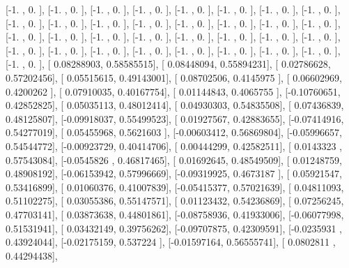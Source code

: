 \documentclass{article}
\begin{document}
       [-1.        ,  0.        ],
       [-1.        ,  0.        ],
       [-1.        ,  0.        ],
       [-1.        ,  0.        ],
       [-1.        ,  0.        ],
       [-1.        ,  0.        ],
       [-1.        ,  0.        ],
       [-1.        ,  0.        ],
       [-1.        ,  0.        ],
       [-1.        ,  0.        ],
       [-1.        ,  0.        ],
       [-1.        ,  0.        ],
       [-1.        ,  0.        ],
       [-1.        ,  0.        ],
       [-1.        ,  0.        ],
       [-1.        ,  0.        ],
       [-1.        ,  0.        ],
       [-1.        ,  0.        ],
       [-1.        ,  0.        ],
       [-1.        ,  0.        ],
       [-1.        ,  0.        ],
       [-1.        ,  0.        ],
       [-1.        ,  0.        ],
       [-1.        ,  0.        ],
       [-1.        ,  0.        ],
       [-1.        ,  0.        ],
       [-1.        ,  0.        ],
       [-1.        ,  0.        ],
       [-1.        ,  0.        ],
       [-1.        ,  0.        ],
       [-1.        ,  0.        ],
       [-1.        ,  0.        ],
       [-1.        ,  0.        ],
       [ 0.08288903,  0.58585515],
       [ 0.08448094,  0.55894231],
       [ 0.02786628,  0.57202456],
       [ 0.05515615,  0.49143001],
       [ 0.08702506,  0.4145975 ],
       [ 0.06602969,  0.4200262 ],
       [ 0.07910035,  0.40167754],
       [ 0.01144843,  0.4065755 ],
       [-0.10760651,  0.42852825],
       [ 0.05035113,  0.48012414],
       [ 0.04930303,  0.54835508],
       [ 0.07436839,  0.48125807],
       [-0.09918037,  0.55499523],
       [ 0.01927567,  0.42883655],
       [-0.07414916,  0.54277019],
       [ 0.05455968,  0.5621603 ],
       [-0.00603412,  0.56869804],
       [-0.05996657,  0.54544772],
       [-0.00923729,  0.40414706],
       [ 0.00444299,  0.42582511],
       [ 0.0143323 ,  0.57543084],
       [-0.0545826 ,  0.46817465],
       [ 0.01692645,  0.48549509],
       [ 0.01248759,  0.48908192],
       [-0.06153942,  0.57996669],
       [-0.09319925,  0.4673187 ],
       [ 0.05921547,  0.53416899],
       [ 0.01060376,  0.41007839],
       [-0.05415377,  0.57021639],
       [ 0.04811093,  0.51102275],
       [ 0.03055386,  0.55147571],
       [ 0.01123432,  0.54236869],
       [ 0.07256245,  0.47703141],
       [ 0.03873638,  0.44801861],
       [-0.08758936,  0.41933006],
       [-0.06077998,  0.51531941],
       [ 0.03432149,  0.39756262],
       [-0.09707875,  0.42309591],
       [-0.0235931 ,  0.43924044],
       [-0.02175159,  0.537224  ],
       [-0.01597164,  0.56555741],
       [ 0.0802811 ,  0.44294438],
\end{document}
